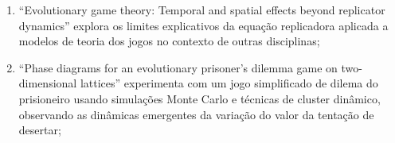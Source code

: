 \begin{enumerate}
\item ``Evolutionary game theory: Temporal and spatial effects beyond replicator dynamics'' explora os limites explicativos da equação replicadora aplicada a modelos de teoria dos jogos no contexto de outras disciplinas;%
\item ``Phase diagrams for an evolutionary prisoner’s dilemma game on two-dimensional lattices'' experimenta com um jogo simplificado de dilema do prisioneiro usando simulações Monte Carlo e técnicas de cluster dinâmico, observando as dinâmicas emergentes da variação do valor da tentação de desertar;%

\end{enumerate}
